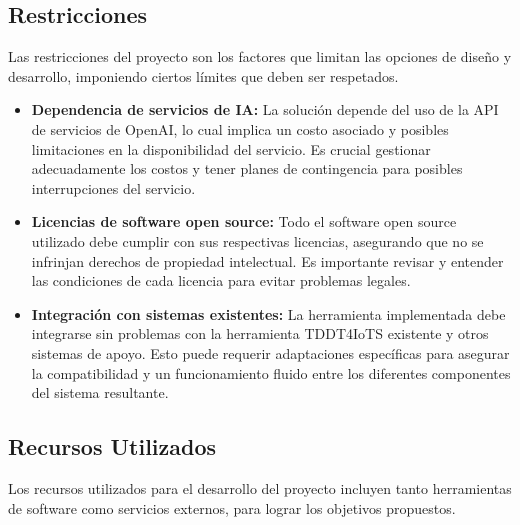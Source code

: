 \subsection{Restricciones}

Las restricciones del proyecto son los factores que limitan las opciones de diseño y desarrollo, imponiendo ciertos límites que deben ser respetados.

\begin{itemize}
	\item \textbf{Dependencia de servicios de IA:}
	La solución depende del uso de la API de servicios de OpenAI, lo cual implica un costo asociado y posibles limitaciones en la disponibilidad del servicio. Es crucial gestionar adecuadamente los costos y tener planes de contingencia para posibles interrupciones del servicio.
	
	\item \textbf{Licencias de software open source:}
	Todo el software open source utilizado debe cumplir con sus respectivas licencias, asegurando que no se infrinjan derechos de propiedad intelectual. Es importante revisar y entender las condiciones de cada licencia para evitar problemas legales.
	
	\item \textbf{Integración con sistemas existentes:}
	La herramienta implementada debe integrarse sin problemas con la herramienta TDDT4IoTS existente y otros sistemas de apoyo. Esto puede requerir adaptaciones específicas para asegurar la compatibilidad y un funcionamiento fluido entre los diferentes componentes del sistema resultante.
\end{itemize}

\subsection{Recursos Utilizados}

Los recursos utilizados para el desarrollo del proyecto incluyen tanto herramientas de software como servicios externos, para lograr los objetivos propuestos.

